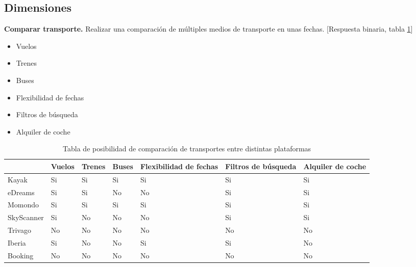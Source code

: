 \subsection{Dimensiones}

\textbf{Comparar transporte.} Realizar una comparación de múltiples medios de transporte en unas fechas. [Respuesta binaria, tabla \ref{table:comp-transporte}]
\begin{itemize}
    \item Vuelos
    \item Trenes
    \item Buses
    \item Flexibilidad de fechas 
    \item Filtros de búsqueda 
    \item Alquiler de coche 
\end{itemize}

\begin{table}[H]
    \centering
    \begin{tabular}{l|l|l|l|l|l|l|}
    \cline{2-7}
                                     & Vuelos & Trenes & Buses & Flexibilidad de fechas & Filtros de búsqueda & Alquiler de coche \\ \hline
    \multicolumn{1}{|l|}{Kayak}      & Si     & Si     & Si    & Si                     & Si                  & Si                \\ \hline
    \multicolumn{1}{|l|}{eDreams}    & Si     & Si     & No    & No                     & Si                  & Si                \\ \hline
    \multicolumn{1}{|l|}{Momondo}    & Si     & Si     & Si    & Si                     & Si                  & Si                \\ \hline
    \multicolumn{1}{|l|}{SkyScanner} & Si     & No     & No    & No                     & Si                  & Si                \\ \hline
    \multicolumn{1}{|l|}{Trivago}    & No     & No     & No    & No                     & No                  & No                \\ \hline
    \multicolumn{1}{|l|}{Iberia}     & Si     & No     & No    & Si                     & Si                  & No                \\ \hline
    \multicolumn{1}{|l|}{Booking}    & No     & No     & No    & No                     & No                  & No                \\ \hline
    \end{tabular}
    \caption{Tabla de posibilidad de comparación de transportes entre distintas plataformas}
    \label{table:comp-transporte}
\end{table}

